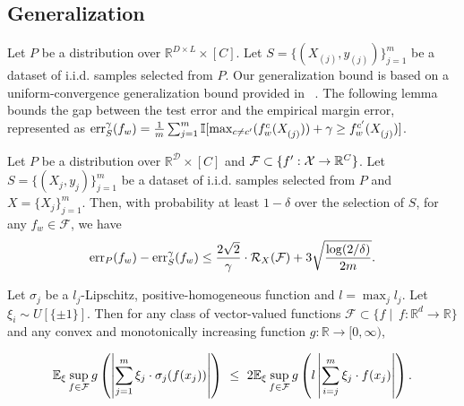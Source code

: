 \setcounter{section}{2}
\subsection{Generalization}

Let $P$ be a distribution over $\mathbb{R}^{D \times L} \times [C]$. Let $S = \{( X^{}_{(j)},y_{(j)})\}^{m}_{j=1}$ be a dataset of i.i.d. samples selected from $P$. Our generalization bound is based on a uniform-convergence generalization bound provided in ~\citep{galanti2024norm}. The following lemma bounds the gap between the test error and the empirical margin error, represented as $\textnormal{err}^{\gamma}_S(f_w)= 
{\textstyle\frac{1}{m}}\sum^{m}_{j=1}\mathbb{I}[\max_{c \neq c'}(f^c_w( X^{}_{(j)})) + \gamma \geq f^{c'}_w( X^{}_{(j)})]$. 

\begin{lemma}\label{lem:loss_ramp}
Let $P$ be a distribution over $\mathbb{R}^{\mathcal{D}} \times [C]$ and $\mathcal{F} \subset \{f':\mathcal{X} \to \mathbb{R}^C \}$. Let $S = \{(X_j,y_j)\}^{m}_{j=1}$ be a dataset of i.i.d. samples selected from $P$ and $X=\{X_j\}^{m}_{j=1}$. Then, with probability at least $1-\delta$ over the selection of $S$, for any $f_w \in \mathcal{F}$, we have
\begin{equation}\label{eq:Radbound}
\textnormal{err}_P(f_w) - \textnormal{err}^{\gamma}_S(f_w) \leq \frac{2\sqrt{2}}{\gamma} \cdot \mathcal{R}_{X}(\mathcal{F}) + 3\sqrt{\frac{\log(2/\delta)}{2m}}.
\end{equation} 
\end{lemma}
\begin{lemma}\label{lem:peeling}
Let $\sigma_j$ be a $l_j$-Lipschitz, positive-homogeneous function and $l=\max_j l_j$. Let $\xi_i \sim U[\{\pm 1\}]$. Then for any class of vector-valued functions $\mathcal{F} \subset \{f \mid ~f:\mathbb{R}^d \to \mathbb{R}\}$ and any convex and monotonically
increasing function $g : \mathbb{R} \to [0,\infty)$, 
\begin{small}
\begin{equation*}
\begin{aligned}
\mathbb{E}_{\xi} \sup_{\substack{f\in \mathcal{F}}} g\left( \left| \sum^{m}_{j=1} \xi_j \cdot \sigma_j(f(x_j))\right| \right)
~\leq~ 2\mathbb{E}_{\xi} \sup_{f\in \mathcal{F}} g\left(l\left|\sum^{m}_{i=j} \xi_j  \cdot f(x_j)\right| \right).
\end{aligned}
\end{equation*}
\end{small}
\end{lemma}
